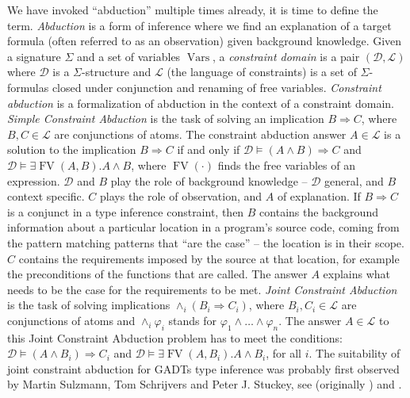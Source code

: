 \documentclass{article}
\newcommand{\cdummy}{\cdot}
\newcommand{\tmem}[1]{{\em #1\/}}
\newcommand{\tmop}[1]{\ensuremath{\operatorname{#1}}}
\begin{document}
We have invoked ``abduction'' multiple times already, it is time to define the
term. {\tmem{Abduction}} is a form of inference where we find an explanation
of a target formula (often referred to as an observation) given background
knowledge. Given a signature $\Sigma$ and a set of variables $\tmop{Vars}$, a
{\tmem{constraint domain}} is a pair $(\mathcal{D}, \mathcal{L})$ where
$\mathcal{D}$ is a $\Sigma$-structure and $\mathcal{L}$ (the language of
constraints) is a set of $\Sigma$-formulas closed under conjunction and
renaming of free variables. {\tmem{Constraint abduction}} is a formalization
of abduction in the context of a constraint domain. {\tmem{Simple Constraint
Abduction}} is the task of solving an implication $B \Rightarrow C$, where $B,
C \in \mathcal{L}$ are conjunctions of atoms. The constraint abduction answer
$A \in \mathcal{L}$ is a solution to the implication $B \Rightarrow C$ if and
only if $\mathcal{D} \vDash (A \wedge B) \Rightarrow C$ and $\mathcal{D}
\vDash \exists \tmop{FV} (A, B) .A \wedge B$, where $\tmop{FV} (\cdummy)$
finds the free variables of an expression. $\mathcal{D}$ and $B$ play the role
of background knowledge -- $\mathcal{D}$ general, and $B$ context specific.
$C$ plays the role of observation, and $A$ of explanation. If $B \Rightarrow
C$ is a conjunct in a type inference constraint, then $B$ contains the
background information about a particular location in a program's source code,
coming from the pattern matching patterns that ``are the case'' -- the
location is in their scope. $C$ contains the requirements imposed by the
source at that location, for example the preconditions of the functions that
are called. The answer $A$ explains what needs to be the case for the
requirements to be met. {\tmem{Joint Constraint Abduction}} is the task of
solving implications $\wedge_i (B_i \Rightarrow C_i)$, where $B_i, C_i \in
\mathcal{L}$ are conjunctions of atoms and $\wedge_i \varphi_i$ stands for
$\varphi_1 \wedge \ldots \wedge \varphi_n$. The answer $A \in \mathcal{L}$ to
this Joint Constraint Abduction problem has to meet the conditions:
$\mathcal{D} \vDash (A \wedge B_i) \Rightarrow C_i$ and $\mathcal{D} \vDash
\exists \tmop{FV} (A, B_i) .A \wedge B_i$, for all $i$. The suitability of
joint constraint abduction for GADTs type inference was probably first
observed by Martin Sulzmann, Tom Schrijvers and Peter J. Stuckey, see
{\cite{SulzmannAbdGADTsRep}} (originally {\cite{SulzmannAbdGADTs}}) and
{\cite{AbdEADTs}}.
\end{document}
